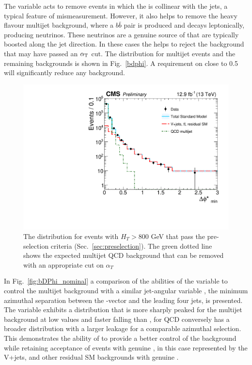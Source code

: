 The \bdphi variable acts to remove events in which the \MET is
collinear with the jets, a typical feature of mismeasurement. However,
it also helps to remove the heavy flavour \QCD multijet background,
where a $b\bar{b}$ pair is produced and decays leptonically, producing
neutrinos. These neutrinos are a genuine source of \MET that are
typically boosted along the jet direction. In these cases the \bdphi
helps to reject the \QCD background that may have passed an $\alpha_{\text{T}}$
cut. The \bdphi distribution for multijet events and the remaining \SM
backgrounds is shown in Fig.~\ref{bdphi}. A requirement on \bdphi
close to 0.5 will significantly reduce any \QCD background.

\begin{figure}
	\begin{center}
		\includegraphics[width=0.7\linewidth]{figs/analysis/eventSelection/CMS-PAS-SUS-16-016_Figure-aux_002}%
	\end{center}
  \caption{The \bdphi distribution for events with $H_T>800$ GeV that
  pass the pre-selection criteria (Sec.~\ref{sec:preselection}). The
  green dotted line shows the expected multijet QCD background that
  can be removed with an appropriate cut on $\alpha_T$}
	\label{fig:bdphi}
\end{figure}


In Fig.~\ref{fig:bDPhi_nominal} a comparison of the abilities of the
\bdphi variable to control the \QCD multijet background with a similar
jet-\mht angular variable \dphimhtj, the minimum azimuthal separation
between the \mht-vector and the leading four jets, is presented. The
\bdphi variable exhibits a distribution that is more sharply peaked
for the \QCD multijet background at low values and faster falling than
\dphimhtj,  \dphimhtj for QCD conversely has a broader distribution
with a larger leakage for a comparable azimuthal selection. This
demonstrates the ability of \bdphi to provide a better control of the
\QCD background while retaining acceptance of events with genuine \mht,
in this case represented by the V+jets, \ttbar and other residual SM
backgrounds with genuine \met. 

